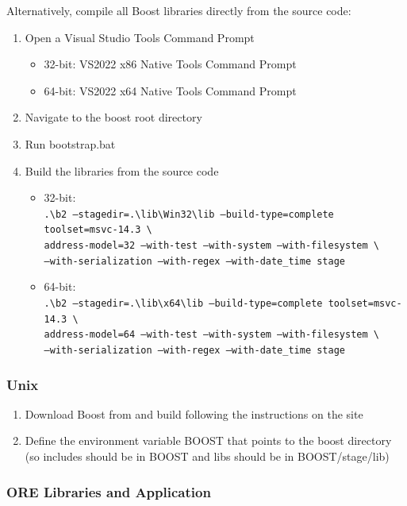 \documentclass[12pt, a4paper]{article}
\newcommand{\bs}{\textbackslash}
\begin{document}
Alternatively, compile all Boost libraries directly from the source code:

\begin{enumerate}
\item Open a Visual Studio Tools Command Prompt
\begin{itemize}
\item 32-bit: VS2022 x86 Native Tools Command Prompt
\item 64-bit: VS2022 x64 Native Tools Command Prompt
\end{itemize}
\item Navigate to the boost root directory
\item Run bootstrap.bat
\item Build the libraries from the source code
\begin{itemize}
\item 32-bit: \\
  {\footnotesize\tt .{\bs}b2 --stagedir=.{\bs}lib{\bs}Win32{\bs}lib --build-type=complete toolset=msvc-14.3 \bs \\
    address-model=32 --with-test --with-system --with-filesystem  \bs \\
    --with-serialization --with-regex --with-date\_time stage}
\item 64-bit: \\
  {\footnotesize\tt .{\bs}b2 --stagedir=.{\bs}lib{\bs}x64{\bs}lib --build-type=complete toolset=msvc-14.3 \bs \\
    address-model=64 --with-test --with-system --with-filesystem \bs \\
    --with-serialization --with-regex --with-date\_time stage}
\end{itemize}
\end{enumerate}

\subsubsection*{Unix}

\begin{enumerate}
\item Download Boost from \cite{boost} and build following the instructions on the site
\item Define the environment variable BOOST that points to the boost directory
(so includes should be in BOOST and libs should be in BOOST/stage/lib)
\end{enumerate}

\subsubsection{ORE Libraries and Application}\label{sec:build}
\end{document}
